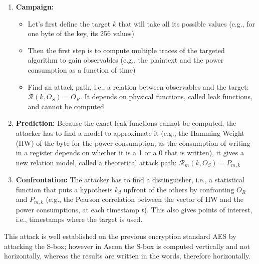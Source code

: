 \documentclass[11pt,technote]{IEEEtran}
\begin{document}
	\begin{enumerate}
		\item \textbf{Campaign:}
		\begin{itemize}
			\item Let's first define the target $k$ that will take all its possible values (e.g., for one byte of the key, its 256 values)
			\item Then the first step is to compute multiple traces of the targeted algorithm to gain observables (e.g., the plaintext and the power consumption as a function of time)
			\item Find an attack path, i.e., a relation between observables and the target: $\mathcal{R}(k,O_S) = O_R$. It depends on physical functions, called leak functions, and cannot be computed
		\end{itemize}
		\item \textbf{Prediction:} Because the exact leak functions cannot be computed, the attacker has to find a model to approximate it (e.g., the Hamming Weight (HW) of the byte for the power consumption, as the consumption of writing in a register depends on whether it is a 1 or a 0 that is written), it gives a new relation model, called a theoretical attack path: $\mathcal{R}_m(k,O_S) = P_{m,k}$
		\item \textbf{Confrontation:} The attacker has to find a distinguisher, i.e., a statistical function that puts a hypothesis $k_d$ upfront of the others by confronting $O_R$ and $P_{m,k}$ (e.g., the Pearson correlation between the vector of HW and the power consumptions, at each timestamp $t$). This also gives points of interest, i.e., timestamps where the target is used.
	\end{enumerate}
	
	This attack is well established on the previous encryption standard AES \cite{cpa_aes,aes} by attacking the S-box; however in Ascon the S-box is computed vertically and not horizontally, whereas the results are written in the words, therefore horizontally.
	
\end{document}
